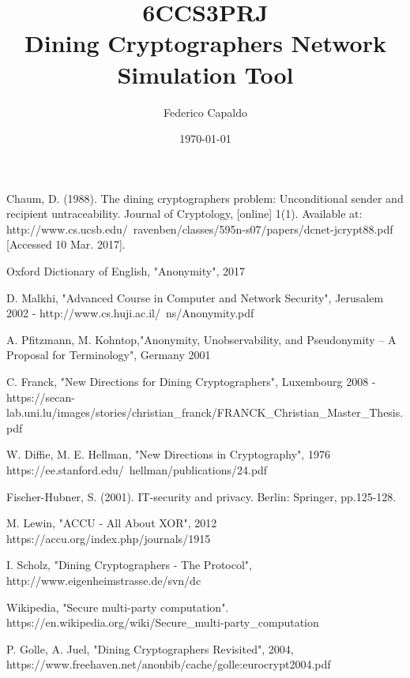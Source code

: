 \documentclass[12pt]{informatics-report}
\title{6CCS3PRJ\\\vspace{0.2cm}Dining Cryptographers Network Simulation Tool}
\author{Federico Capaldo}
\date{\today}
\begin{document}
\setcounter{secnumdepth}{5}

\createFrontMatter
\onehalfspacing
\tableofcontents
\doublespacing



















\begin{thebibliography}{99}

 Chaum, D. (1988). The dining cryptographers problem: Unconditional sender and recipient untraceability. Journal of Cryptology, [online] 1(1). Available at: http://www.cs.ucsb.edu/~ravenben/classes/595n-s07/papers/dcnet-jcrypt88.pdf [Accessed 10 Mar. 2017].

 Oxford Dictionary of English, "Anonymity", 2017

 D. Malkhi, "Advanced Course in Computer and Network Security", Jerusalem 2002 - http://www.cs.huji.ac.il/~ns/Anonymity.pdf

 A. Pfitzmann, M. Kohntop,"Anonymity, Unobservability, and Pseudonymity – A Proposal for Terminology", Germany 2001

 C. Franck, "New Directions for Dining Cryptographers", Luxembourg 2008 - https://secan-lab.uni.lu/images/stories/christian{\_}franck/FRANCK{\_}Christian{\_}Master{\_}Thesis.pdf

 W. Diffie, M. E. Hellman, "New Directions in Cryptography", 1976 https://ee.stanford.edu/~hellman/publications/24.pdf

 Fischer-Hubner, S. (2001). IT-security and privacy. Berlin: Springer, pp.125-128.

 M. Lewin, "ACCU - All About XOR", 2012 https://accu.org/index.php/journals/1915

 I. Scholz, "Dining Cryptographers - The Protocol", http://www.eigenheimstrasse.de/svn/dc

 Wikipedia, "Secure multi-party computation". https://en.wikipedia.org/wiki/Secure{\_}multi-party{\_}computation

 P. Golle, A. Juel, "Dining Cryptographers Revisited", 2004, https://www.freehaven.net/anonbib/cache/golle:eurocrypt2004.pdf 


\end{thebibliography}



\appendix


\end{document}
